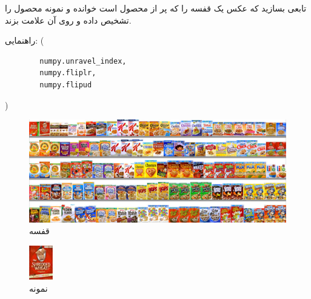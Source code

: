 \documentclass[11pt,professionalfonts]{article}
\begin{document}
	تابعی بسازید که عکس یک قفسه را که پر از محصول است خوانده و نمونه محصول را تشخیص داده و روی آن علامت بزند.
	
	راهنمایی:  (\begin{verbatim}
		numpy.unravel_index,
		numpy.fliplr,
		numpy.flipud
	\end{verbatim})
	
	\begin{figure}[H]
		\centering
		\includegraphics[width=0.7\linewidth]{Files/shelf.jpg}
		\caption{قفسه}
	\end{figure}
	\begin{figure}[H]
		\centering
		\includegraphics[width=0.7\linewidth]{Files/template.jpg}
		\caption{نمونه}
		
	\end{figure}
	
	
\end{document}
